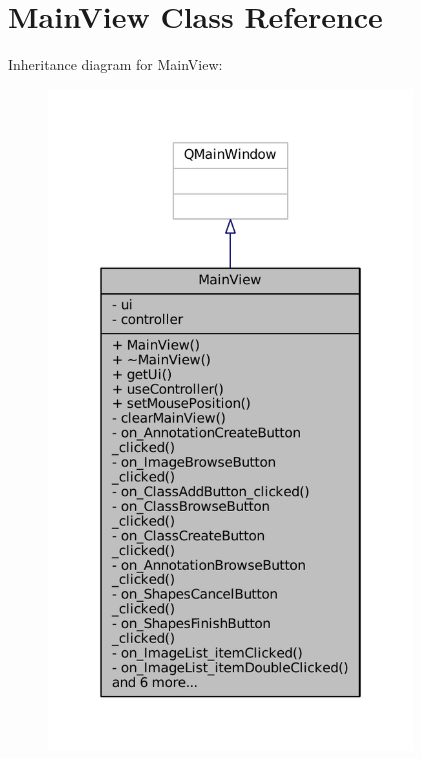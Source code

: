 \hypertarget{classMainView}{}\section{Main\+View Class Reference}
\label{classMainView}


Inheritance diagram for Main\+View\+:
\nopagebreak
\begin{figure}[H]
\begin{center}
\leavevmode
\includegraphics[width=274pt]{classMainView__inherit__graph}
\end{center}
\end{figure}


